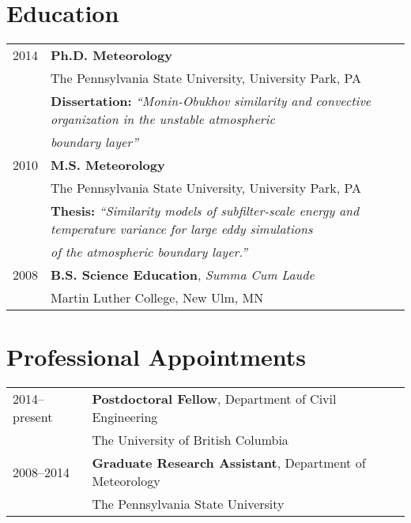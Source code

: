 \documentclass[11pt,letterpaper]{article}
\begin{document}
\section*{Education}
\begin{tabular}{l l}
2014 & \textbf{Ph.D. Meteorology} \\
      & The Pennsylvania State University, University Park, PA \\
      & {\small \textbf{Dissertation:}} \textit{\small``Monin-Obukhov similarity and convective organization in the unstable atmospheric}\\
      & \textit{\small boundary layer''} \\[1.5\parskip]

2010 & \textbf{M.S. Meteorology} \\
      & The Pennsylvania State University, University Park, PA \\
      & {\small \textbf{Thesis:}} \textit{\small ``Similarity models of subfilter-scale energy and temperature variance for large eddy simulations} \\
      & \textit{\small of the atmospheric boundary layer.''} \\[1.5\parskip]

2008 & \textbf{B.S. Science Education}, \textit{Summa Cum Laude} \\
              & Martin Luther College, New Ulm, MN
\end{tabular}

\section*{Professional Appointments} 

\begin{tabular}{l l}
2014--present & \textbf{Postdoctoral Fellow}, Department of Civil Engineering \\
              & The University of British Columbia \\[1.5\parskip]
2008--2014 & \textbf{Graduate Research Assistant}, Department of Meteorology \\
                 & The Pennsylvania State University
\end{tabular}

\end{document}
